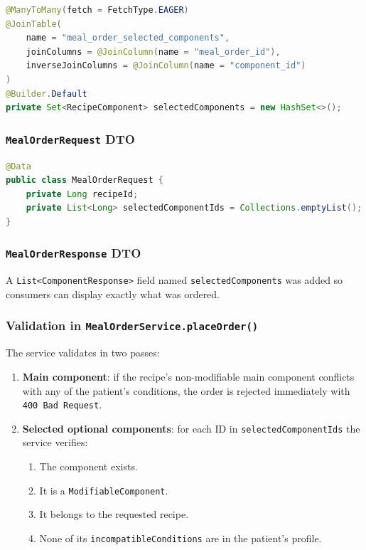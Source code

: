 \documentclass[12pt,a4paper]{article}
\begin{document}
\begin{lstlisting}[language=Java, caption={MealOrder.java — selectedComponents field}]
@ManyToMany(fetch = FetchType.EAGER)
@JoinTable(
    name = "meal_order_selected_components",
    joinColumns = @JoinColumn(name = "meal_order_id"),
    inverseJoinColumns = @JoinColumn(name = "component_id")
)
@Builder.Default
private Set<RecipeComponent> selectedComponents = new HashSet<>();
\end{lstlisting}

\subsubsection{\texttt{MealOrderRequest} DTO}
\begin{lstlisting}[language=Java, caption={MealOrderRequest.java}]
@Data
public class MealOrderRequest {
    private Long recipeId;
    private List<Long> selectedComponentIds = Collections.emptyList();
}
\end{lstlisting}

\subsubsection{\texttt{MealOrderResponse} DTO}
A \texttt{List<ComponentResponse>} field named \texttt{selectedComponents} was
added so consumers can display exactly what was ordered.

\subsubsection{Validation in \texttt{MealOrderService.placeOrder()}}
The service validates in two passes:
\begin{enumerate}[noitemsep]
  \item \textbf{Main component}: if the recipe's non-modifiable main component
        conflicts with any of the patient's conditions, the order is rejected
        immediately with \texttt{400 Bad Request}.
  \item \textbf{Selected optional components}: for each ID in
        \texttt{selectedComponentIds} the service verifies:
        \begin{enumerate}[noitemsep]
          \item The component exists.
          \item It is a \texttt{ModifiableComponent}.
          \item It belongs to the requested recipe.
          \item None of its \texttt{incompatibleConditions} are in the patient's profile.
        \end{enumerate}
\end{enumerate}
\end{document}
